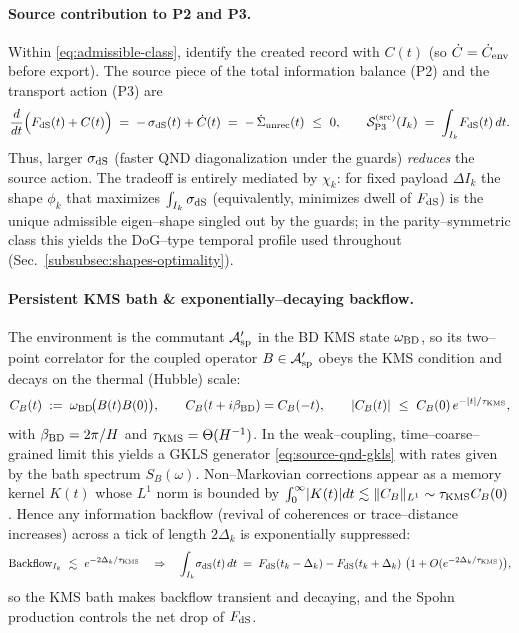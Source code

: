\documentclass[10pt]{article}
\theoremstyle{definition}
\theoremstyle{plain}
\begin{document}
\paragraph{Source contribution to P2 and P3.}\label{par:uom-main-033}
Within \eqref{eq:admissible-class}, identify the created record with $C(t)$
(so $\dot C=\dot C_{\rm env}$ before export). The source piece of the total information
balance (P2) and the transport action (P3) are
\begin{equation}
\frac{d}{dt}\Big(F_{\rm dS}(t)+C(t)\Big)\;=\;-\,\sigma_{\rm dS}(t)+\dot C(t)\;=\;-\,\dot{\Sigma}_{\rm unrec}(t)\ \le\ 0,
\qquad
\mathcal S_{\rm P3}^{\rm (src)}(I_k)\;=\;\int_{I_k}\!F_{\rm dS}(t)\,dt.
\label{eq:P2-P3-source}
\end{equation}
Thus, larger $\sigma_{\rm dS}$ (faster QND diagonalization under the guards) \emph{reduces}
the source action. The tradeoff is entirely mediated by $\chi_k$: for fixed payload
$\Delta I_k$ the shape $\phi_k$ that maximizes $\int_{I_k}\sigma_{\rm dS}$ (equivalently,
minimizes dwell of $F_{\rm dS}$) is the unique admissible eigen–shape singled out by the
guards; in the parity–symmetric class this yields the DoG–type temporal profile used
throughout (Sec.~\ref{subsubsec:shapes-optimality}).

\paragraph{Persistent KMS bath \& exponentially–decaying backflow.}
\label{par:exp-backflow}
The environment is the commutant $\mathcal A_{\rm sp}'$ in the BD KMS state
$\omega_{\rm BD}$, so its two–point correlator for the coupled operator $B\in\mathcal A_{\rm sp}'$
obeys the KMS condition and decays on the thermal (Hubble) scale:
\[
C_B(t)\;:=\;\omega_{\rm BD}\!\big(B(t)B(0)\big),\qquad
C_B(t+i\beta_{\rm BD})=C_B(-t),\qquad
|C_B(t)|\ \le\ C_B(0)\,e^{-|t|/\tau_{\rm KMS}},
\]
with $\beta_{\rm BD}=2\pi/H$ and $\tau_{\rm KMS}=\Theta(H^{-1})$.
In the weak–coupling, time–coarse–grained limit this yields a GKLS generator
\eqref{eq:source-qnd-gkls} with rates given by the bath spectrum $S_B(\omega)$.
Non–Markovian corrections appear as a memory kernel $K(t)$ whose $L^1$ norm is bounded
by $\int_0^\infty\!|K(t)|dt\lesssim\|C_B\|_{L^1}\sim\tau_{\rm KMS}C_B(0)$. Hence any
information backflow (revival of coherences or trace–distance increases) across a tick of
length $2\Delta_k$ is exponentially suppressed:
\[
\text{Backflow}_{I_k}\ \lesssim\ e^{-2\Delta_k/\tau_{\rm KMS}}\quad\Rightarrow\quad
\int_{I_k}\!\sigma_{\rm dS}(t)\,dt\;=\;F_{\rm dS}(t_k-\Delta_k)-F_{\rm dS}(t_k+\Delta_k)\ \big(1+O(e^{-2\Delta_k/\tau_{\rm KMS}})\big),
\]
so the KMS bath makes backflow transient and decaying, and the Spohn production controls the net drop of $F_{\rm dS}$.
\end{document}
